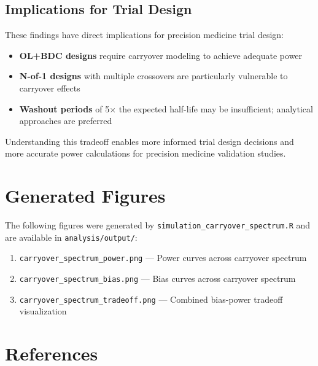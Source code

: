 \documentclass[11pt,a4paper]{article}
\begin{document}
\subsection{Implications for Trial Design}

These findings have direct implications for precision medicine trial design:

\begin{itemize}
    \item \textbf{OL+BDC designs} require carryover modeling to achieve adequate power
    \item \textbf{N-of-1 designs} with multiple crossovers are particularly vulnerable
          to carryover effects
    \item \textbf{Washout periods} of 5$\times$ the expected half-life may be insufficient;
          analytical approaches are preferred
\end{itemize}

Understanding this tradeoff enables more informed trial design decisions and
more accurate power calculations for precision medicine validation studies.

\appendix
\section{Generated Figures}

The following figures were generated by \texttt{simulation\_carryover\_spectrum.R} and
are available in \texttt{analysis/output/}:

\begin{enumerate}
    \item \texttt{carryover\_spectrum\_power.png} --- Power curves across carryover spectrum
    \item \texttt{carryover\_spectrum\_bias.png} --- Bias curves across carryover spectrum
    \item \texttt{carryover\_spectrum\_tradeoff.png} --- Combined bias-power tradeoff visualization
\end{enumerate}

\section*{References}
\end{document}
